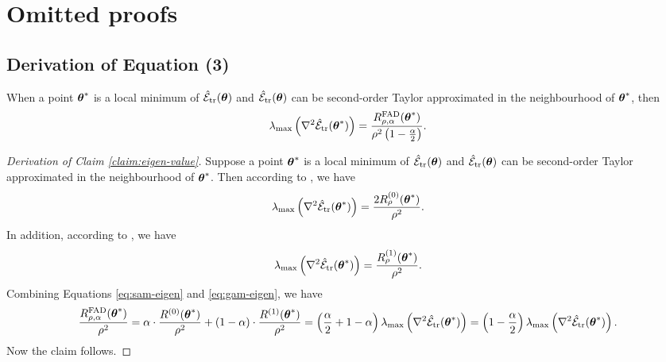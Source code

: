 \section{Omitted proofs}
\subsection{Derivation of Equation (3)}
\begin{claim}  \label{claim:eigen-value}
    When a point $\boldsymbol{\theta}^*$ is a local minimum of $\hat{\mathcal{E}}_{{\text{tr}}}(\boldsymbol{\theta})$ and $\hat{\mathcal{E}}_{{\text{tr}}}(\boldsymbol{\theta})$ can be second-order Taylor approximated in the neighbourhood of $\boldsymbol{\theta}^*$, then
    \begin{equation} \label{eq:fad-eigen-restate}
      \lambda_{\max}\left(\nabla^2 \hat{\mathcal{E}}_{{\text{tr}}}(\boldsymbol{\theta}^*)\right) = \frac{R^{\text{FAD}}_{\rho, \alpha}(\boldsymbol{\theta}^*)}{\rho^2\left(1 - \frac{\alpha}{2}\right)}.
    \end{equation}
\end{claim}

\begin{proof} [Derivation of Claim \ref{claim:eigen-value}]
    Suppose a point $\boldsymbol{\theta}^*$ is a local minimum of $\hat{\mathcal{E}}_{{\text{tr}}}(\boldsymbol{\theta})$ and $\hat{\mathcal{E}}_{{\text{tr}}}(\boldsymbol{\theta})$ can be second-order Taylor approximated in the neighbourhood of $\boldsymbol{\theta}^*$. Then according to \cite[Lemma 3.3]{zhuang2022surrogate}, we have
    \begin{equation} \label{eq:sam-eigen}
        \lambda_{\max}\left(\nabla^2 \hat{\mathcal{E}}_{{\text{tr}}}(\boldsymbol{\theta}^*)\right) = \frac{2 R^{(0)}_{\rho}(\boldsymbol{\theta}^*)}{\rho^2}.
    \end{equation}
    In addition, according to \cite[Lemma 4.1]{Zhang2023GradientNA}, we have
    \begin{equation} \label{eq:gam-eigen}
        \lambda_{\max}\left(\nabla^2 \hat{\mathcal{E}}_{{\text{tr}}}(\boldsymbol{\theta}^*)\right) = \frac{R^{(1)}_{\rho}(\boldsymbol{\theta}^*)}{\rho^2}.
    \end{equation}
    Combining Equations \eqref{eq:sam-eigen} and \eqref{eq:gam-eigen}, we have
    \begin{equation}
        \frac{R^{\text{FAD}}_{\rho, \alpha}(\boldsymbol{\theta}^*)}{\rho^2} = \alpha \cdot \frac{R^{(0)}(\boldsymbol{\theta}^*)}{\rho^2} + (1-\alpha) \cdot \frac{R^{(1)}(\boldsymbol{\theta}^*)}{\rho^2} = \left(\frac{\alpha}{2} + 1 - \alpha\right)\lambda_{\max}\left(\nabla^2 \hat{\mathcal{E}}_{{\text{tr}}}(\boldsymbol{\theta}^*)\right) = \left(1 - \frac{\alpha}{2}\right)\lambda_{\max}\left(\nabla^2 \hat{\mathcal{E}}_{{\text{tr}}}(\boldsymbol{\theta}^*)\right).
    \end{equation}
    Now the claim follows.
\end{proof}

